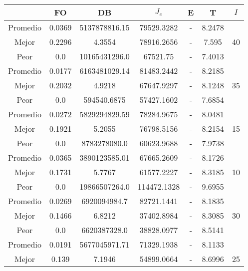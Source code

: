 \begin{table}[h!]
    \footnotesize
    \begin{center}
        \begin{tabular}{|c|c|c|c|c|c|c|}
        \hline
            & {\bf FO} & {\bf DB} & $J_e$ & {\bf E} & {\bf T} & $I$\\
        \hline
        \hline
            Promedio  & 0.0369 & 5137878816.15 & 79529.3282 & - & 8.2478 & \\
            \cline{1-6}
            Mejor & 0.2296 & 4.3554  & 78916.2656 & - & 7.595 & 40\\
            \cline{1-6}
            Peor & 0.0 & 10165431296.0  & 67521.75 & - & 7.4013 & \\
        \hline
        \hline
            Promedio  & 0.0177 & 6163481029.14 & 81483.2442 & - & 8.2185 & \\
            \cline{1-6}
            Mejor & 0.2032 & 4.9218  & 67647.9297 & - & 8.1248 & 35\\
            \cline{1-6}
            Peor & 0.0 & 594540.6875  & 57427.1602 & - & 7.6854 & \\
        \hline
        \hline
            Promedio  & 0.0272 & 5829294829.59 & 78284.9675 & - & 8.0481 & \\
            \cline{1-6}
            Mejor & 0.1921 & 5.2055  & 76798.5156 & - & 8.2154 & 15\\
            \cline{1-6}
            Peor & 0.0 & 8783278080.0  & 60623.9688 & - & 7.9738 & \\
        \hline
        \hline
            Promedio  & 0.0365 & 3890123585.01 & 67665.2609 & - & 8.1726 & \\
            \cline{1-6}
            Mejor & 0.1731 & 5.7767  & 61577.2227 & - & 8.3185 & 10\\
            \cline{1-6}
            Peor & 0.0 & 19866507264.0  & 114472.1328 & - & 9.6955 & \\
        \hline
        \hline
            Promedio  & 0.0269 & 6920094984.7 & 82721.1441 & - & 8.1835 & \\
            \cline{1-6}
            Mejor & 0.1466 & 6.8212  & 37402.8984 & - & 8.3085 & 30\\
            \cline{1-6}
            Peor & 0.0 & 6620387328.0  & 38828.0977 & - & 8.5141 & \\
        \hline
        \hline
            Promedio  & 0.0191 & 5677045971.71 & 71329.1938 & - & 8.1133 & \\
            \cline{1-6}
            Mejor & 0.139 & 7.1946  & 54899.0664 & - & 8.6996 & 25\\

\end{tabular}
\end{center}
\end{table}
